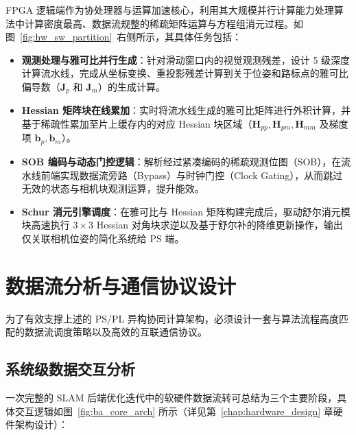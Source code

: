 FPGA 逻辑端作为协处理器与运算加速核心，利用其大规模并行计算能力处理算法中计算密度最高、数据流规整的稀疏矩阵运算与方程组消元过程。如图~\ref{fig:hw_sw_partition}~右侧所示，其具体任务包括：
\begin{itemize}
    \item \textbf{观测处理与雅可比并行生成}：针对滑动窗口内的视觉观测残差，设计 5 级深度计算流水线，完成从坐标变换、重投影残差计算到关于位姿和路标点的雅可比偏导数（$\mathbf{J}_p$ 和 $\mathbf{J}_m$）的生成计算。
    \item \textbf{Hessian 矩阵块在线累加}：实时将流水线生成的雅可比矩阵进行外积计算，并基于稀疏性累加至片上缓存内的对应 Hessian 块区域（$\mathbf{H}_{pp}, \mathbf{H}_{pm}, \mathbf{H}_{mm}$ 及梯度项 $\mathbf{b}_p, \mathbf{b}_m$）。
    \item \textbf{SOB 编码与动态门控逻辑}：解析经过紧凑编码的稀疏观测位图（SOB），在流水线前端实现数据流旁路（Bypass）与时钟门控（Clock Gating），从而跳过无效的状态与相机块观测运算，提升能效。
    \item \textbf{Schur 消元引擎调度}：在雅可比与 Hessian 矩阵构建完成后，驱动舒尔消元模块高速执行 $3 \times 3$ Hessian 对角块求逆以及基于舒尔补的降维更新操作，输出仅关联相机位姿的简化系统给 PS 端。
\end{itemize}


\section{数据流分析与通信协议设计}

为了有效支撑上述的 PS/PL 异构协同计算架构，必须设计一套与算法流程高度匹配的数据流调度策略以及高效的互联通信协议。

\subsection{系统级数据交互分析}

一次完整的 SLAM 后端优化迭代中的软硬件数据流转可总结为三个主要阶段，具体交互逻辑如图~\ref{fig:ba_core_arch} 所示（详见第~\ref{chap:hardware_design} 章硬件架构设计）：

